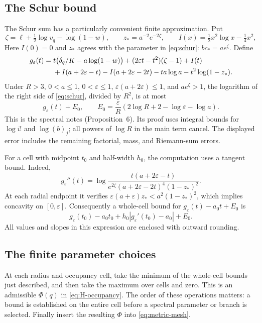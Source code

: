 \subsection{The Schur bound}
The Schur sum has a particularly convenient finite approximation. Put
\[
 \zeta=\ell+\tfrac12\log v_q-\log(1-w),\qquad
 z_*=a^{-2}e^{-2\zeta},\qquad
 I(x)=\tfrac12x^2\log x-\tfrac14x^2,
\]
Here $I(0)=0$ and $z_*$ agrees with the parameter in \eqref{eq:schur}:
$bc_*=ae^\zeta$. Define
\begin{align}
 g_\varepsilon(t)={}&t\bigl(\delta_q/K-a\log(1-w)\bigr)
 +(2\varepsilon t-t^2)(\zeta-1)+I(t)\notag\\
 &+I(a+2\varepsilon-t)-I(a+2\varepsilon-2t)
       -ta\log a-t^2\log(1-z_*).\label{eq:schur-finite}
\end{align}
Under $R>3$, $0<a\leq1$, $0<\varepsilon\leq1$,
$\varepsilon(a+2\varepsilon)\leq1$, and $ae^\zeta>1$, the logarithm of the right side of \eqref{eq:schur}, divided by $R^2$, is at most
\begin{equation}\label{eq:schur-error}
 g_\varepsilon(t)+E_0,\qquad
 E_0=\frac{\varepsilon}{R}
       (2\log R+2-\log\varepsilon-\log a).
\end{equation}
This is the spectral notes (Proposition~6). Its proof uses integral bounds for $\log i!$ and $\log(b)_j$; all powers of $\log R$ in the main term cancel. The displayed error includes the remaining factorial, mass, and Riemann-sum errors.

For a cell with midpoint $t_0$ and half-width $h_0$, the computation uses a tangent bound. Indeed,
\[
 g_\varepsilon''(t)=
 \log\frac{t(a+2\varepsilon-t)}
 {e^{2\zeta}(a+2\varepsilon-2t)^4(1-z_*)^2}.
\]
At each radial endpoint it verifies
$\varepsilon(a+\varepsilon)z_*<a^2(1-z_*)^2$, which implies concavity on $[0,\varepsilon]$. Consequently a whole-cell bound for $g_\varepsilon(t)-a_0t+E_0$ is
\begin{equation}\label{eq:schur-cell}
 g_\varepsilon(t_0)-a_0t_0
       +h_0|g_\varepsilon'(t_0)-a_0|+E_0.
\end{equation}
All values and slopes in this expression are enclosed with outward rounding.

\subsection{The finite parameter choices}
At each radius and occupancy cell, take the minimum of the whole-cell bounds just described, and then take the maximum over cells and zero. This is an admissible $\Phi(q)$ in \eqref{eq:H-occupancy}. The order of these operations matters: a bound is established on the entire cell before a spectral parameter or branch is selected. Finally insert the resulting $\Phi$ into \eqref{eq:metric-mesh}.

